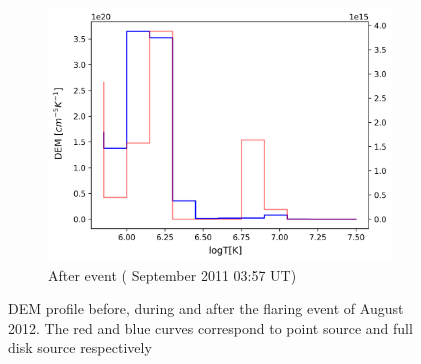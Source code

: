 \begin{figure}[h!]
\begin{subfigure}[b]{0.3\textwidth}
        \centering
        \includegraphics[width=\textwidth]{images/dem_profile_after_event_2012_aug_31.png}
        \caption{After event ( September 2011 03:57 UT)}
    \end{subfigure}

    \caption[DEM profile for  August 2012 Event]{DEM profile before, during and after the flaring event of  August 2012. The red and blue curves correspond to point source and full disk source respectively}
    \label{fig:dem_pro_aug_31_2012}
\end{figure}

